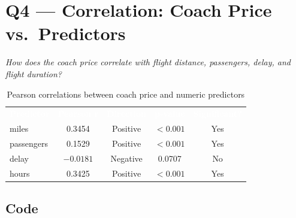 \documentclass[12pt, a4paper]{report}
\newcommand{\thead}[1]{\cellcolor{themeHeaderBg}\textcolor{white}{\textbf{#1}}}
\newcommand{\talt}{\rowcolor{themeRowAlt}}
\newcommand{\trow}{\rowcolor{white}}
\begin{document}
\chapter{Q4 — Correlation: Coach Price vs.\ Predictors}

\textit{How does the coach price correlate with flight distance, passengers, delay, and flight duration?}

\begin{table}[H]
\centering
\renewcommand{\arraystretch}{1.3}
\begin{tabular}{lcccc}
\thead{Predictor} & \thead{Pearson r} & \thead{Direction} & \thead{p-value} & \thead{Significant?} \\
\talt miles      & 0.3454  & Positive & $< 0.001$ & Yes \\
\trow passengers & 0.1529  & Positive & $< 0.001$ & Yes \\
\talt delay      & $-0.0181$ & Negative & 0.0707  & No \\
\trow hours      & 0.3425  & Positive & $< 0.001$ & Yes \\
\end{tabular}
\caption{Pearson correlations between coach price and numeric predictors}
\end{table}

\section{Code}
\end{document}
